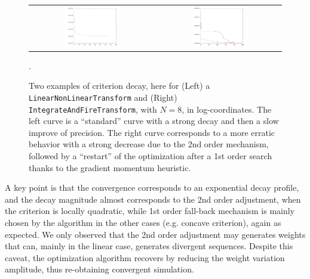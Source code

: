 \begin{figure}[!ht]
  \begin{center}\begin{tabular}{cc}
    \includegraphics[width=0.45\textwidth]{results/reverse_engineering_LinearNonLinearTransform_N=8/costs} &
    \includegraphics[width=0.45\textwidth]{results/reverse_engineering_IntegrateAndFireTransform_N=8/costs}\\
  \end{tabular}\end{center}
  \caption{Two examples of criterion decay, here for (Left) a {\tt LinearNonLinearTransform} and (Right) {\tt IntegrateAndFireTransform}, with $N=8$, in log-coordinates. The left curve is a ``standard'' curve with a strong decay and then a slow improve of precision. The right curve corresponds to a more erratic behavior with a strong decrease due to the 2nd order mechanism, followed by a ``restart'' of the optimization after a 1st order search thanks to the gradient momentum heuristic.}
  \label{criterion-decay-curve}.
\end{figure}

A key point is that the convergence corresponds to an exponential decay profile, and the decay magnitude almost corresponds to the 2nd order adjustment, when the criterion is locally quadratic, while 1st order fall-back mechanism is mainly chosen by the algorithm in the other cases (e.g. concave criterion), again as expected. We only observed that the 2nd order adjustment may generates weights that can, mainly in the linear case, generates divergent sequences. Despite this caveat, the optimization algorithm recovers by reducing the weight variation amplitude, thus re-obtaining convergent simulation.

